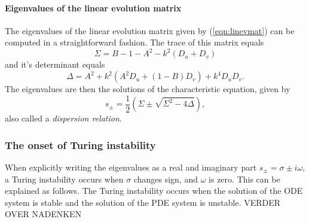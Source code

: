 \paragraph{Eigenvalues of the linear evolution matrix}\hfill\newline
The eigenvalues of the linear evolution matrix given by (\ref{eqn:linevmat}) can be computed in a straightforward fashion. The trace of this matrix equals
\begin{equation}
\Sigma=B-1-A^2-k^2(D_u+D_v)
\end{equation} 
and it's determinant equals
\begin{equation}
\Delta = A^2 + k^2(A^2D_u+(1-B)D_v)+k^4D_uD_v.
\end{equation}
The eigenvalues are then the solutions of the characteristic equation, given by
\begin{equation}
s_{\pm}=\frac{1}{2}(\Sigma\pm\sqrt{\Sigma^2-4\Delta}),
\end{equation}
also called a \textit{dispersion relation}.

\subsubsection{The onset of Turing instability}
When explicitly writing the eigenvalues as a real and imaginary part $s_{\pm}=\sigma\pm i\omega$, a Turing instability occurs when $\sigma$ changes sign, and $\omega$ is zero. This can be explained as follows. The Turing instability occurs when the solution of the ODE system is stable and the solution of the PDE system is unstable. VERDER OVER NADENKEN
